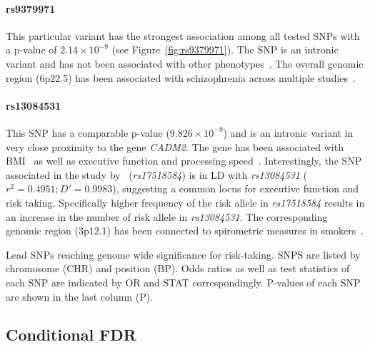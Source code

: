 \paragraph{rs9379971}
\label{par:rs9379971}
This particular variant has the strongest association among all tested SNPs with a p-value of $2.14\times10^{-9}$ (see Figure~\ref{fig:rs9379971}). 
The SNP is an intronic variant and has not been associated with other phenotypes~\cite{Welter2014}.
The overall genomic region (6p22.5) has been associated with schizophrenia across multiple studies~\cite{Aberg2013,Shi2009}.

\paragraph{rs13084531}
\label{par:rs13084531}
This SNP has a comparable p-value ($9.826\times10^{-9}$) and is an intronic variant in very close proximity to the gene \textit{CADM2}.
The gene has been associated with BMI~\cite{Speliotes2010} as well as executive function and processing speed~\cite{Ibrahim-Verbaas2015}.
Interestingly, the SNP associated in the study by~\cite{Ibrahim-Verbaas2015} (\textit{rs17518584}) is in LD with \textit{rs13084531} ($r^2=0.4951;D'=0.9983$), suggesting a common locus for executive function and risk taking.
Specifically higher frequency of the risk allele in \textit{rs17518584} results in an increase in the number of risk allele in \textit{rs13084531}.
The corresponding genomic region (3p12.1) has been connected to spirometric measures in smokers~\cite{Lutz2015}.

\begin{table}
	\small
	\centering
	
  \caption[Lead SNPs]{
    Lead SNPs reaching genome wide significance for risk-taking.
    SNPS are listed by chromosome (CHR) and position (BP).
    Odds ratios as well as test statistics of each SNP are indicated by OR and STAT correspondingly.
    P-values of each SNP are shown in the last column (P).
  }\label{tab:lead_snps_risk}
\end{table}

\subsection{Conditional FDR}
\label{sub:conditional_fdr}

